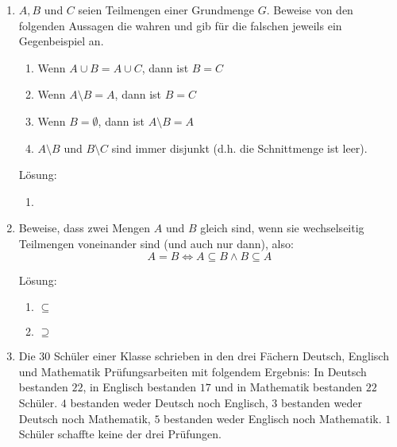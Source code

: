 \documentclass[main.tex]{subfiles}
\begin{document}
\begin{enumerate}
	      Lösung:
	      \begin{multicols}{2}
		      \begin{enumerate}
			      \item \( A \cap B \cap C = \emptyset = \{\} \)
			      \item \( A \cap B \neq \emptyset = \{\} \)
			      \item \( B \cap C \neq \emptyset = \{\} \)
			      \item \( A \cap C \neq \emptyset = \{\} \)
		      \end{enumerate}
	      \end{multicols}
	\item \( A, B \) und \( C \) seien Teilmengen einer Grundmenge \( G \).
	      Beweise von den folgenden Aussagen die wahren und gib für die falschen jeweils ein Gegenbeispiel an.
	      \begin{enumerate}
		      \item Wenn \( A \cup B = A \cup C \), dann ist \( B = C \)
		      \item Wenn \( A \setminus B = A \), dann ist \( B = C \)
		      \item Wenn \( B = \emptyset \), dann ist \(  A \setminus B  = A \)
		      \item \( A \setminus B  \) und \( B \setminus C \) sind immer disjunkt
		            (d.h. die Schnittmenge ist leer).
	      \end{enumerate}

	      Lösung:
	      \begin{enumerate}
		      \item
	      \end{enumerate}
	\item Beweise, dass zwei Mengen \( A \) und \( B \) gleich sind,
	      wenn sie wechselseitig Teilmengen voneinander sind (und auch nur dann),
	      also:
	      \[ A = B \Leftrightarrow A \subseteq B \land B \subseteq A \]

	      Lösung:
	      \begin{enumerate}
		      \item \( \subseteq \)
		      \item \( \supseteq \)
	      \end{enumerate}
	\item Die \( 30 \) Schüler einer Klasse schrieben in den drei Fächern
	      Deutsch, Englisch und Mathematik Prüfungsarbeiten mit folgendem Ergebnis:
	      In Deutsch bestanden \( 22 \), in Englisch bestanden \( 17 \)
	      und in Mathematik bestanden \( 22 \) Schüler.
	      \( 4 \) bestanden weder Deutsch noch Englisch,
	      \( 3 \) bestanden weder Deutsch noch Mathematik,
	      \( 5 \) bestanden weder Englisch noch Mathematik.
	      \( 1 \) Schüler schaffte keine der drei Prüfungen.


\end{enumerate}
\end{document}
